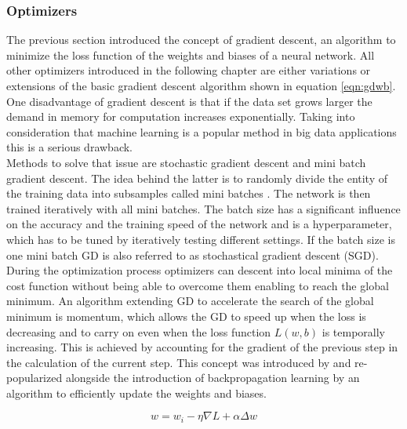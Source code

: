 \subsubsection{Optimizers}
The previous section introduced the concept of gradient descent, an algorithm to minimize
the loss function of the weights and biases of a neural network. All other optimizers
introduced in
the following chapter are either variations or extensions of the basic gradient descent algorithm shown in equation \ref{eqn:gdwb}. \\
One disadvantage of gradient descent is that if the data set grows larger the demand in
memory for computation increases exponentially. Taking into consideration that machine
learning is a popular method in big data applications this is a serious drawback.\\
Methods to solve that issue are stochastic gradient descent and mini batch gradient
descent. The idea behind the latter is to randomly divide the entity of the training data
into subsamples called mini batches \cite{bottou-bousquet-2008}. The network is then
trained iteratively with all mini batches. The batch size has a significant influence on
the accuracy and the training speed of the network and is a hyperparameter, which has to
be tuned by iteratively testing different settings. If
the batch size is one mini batch GD is also referred to as stochastical gradient descent (SGD). \\
During the optimization process optimizers can descent into local minima of the cost
function without being able to overcome them enabling to reach the global minimum. An
algorithm extending GD to accelerate the search of the global minimum is momentum, which
allows the GD to speed up when the loss is decreasing and to carry on even when the loss
function $L(w,b)$ is temporally increasing. This is achieved by accounting for the
gradient of the previous step in the calculation of the current step. This concept was
introduced by \cite{polyak1964} and re-popularized alongside the introduction of
backpropagation learning by \cite{rumelhart1988learning} an algorithm to efficiently
update the weights and biases.

\begin{equation}
 w = w_i - \eta \nabla L + \alpha \Delta w
 \label{eqn:momentum}
\end{equation}


